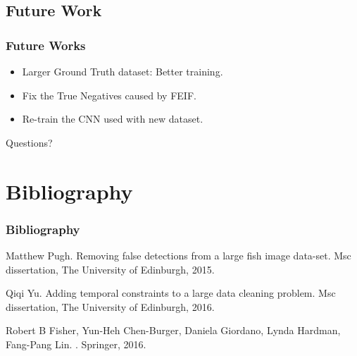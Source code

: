 \documentclass{beamer}[fullspacing]
\begin{document}
\subsection{Future Work}
\begin{frame}
\frametitle{Future Works}
\begin{itemize}
\item
Larger Ground Truth dataset: Better training.
\item
Fix the True Negatives caused by FEIF.
\item
Re-train the CNN used with new dataset.
\end{itemize}
\end{frame}


\begin{frame}
\begin{Huge}
\begin{center}
Questions?
\end{center}
\end{Huge}
\end{frame}




\section*{Bibliography}
\begin{frame}
\frametitle{Bibliography}
\begin{thebibliography}{3} %
Matthew Pugh.
\newblock Removing false detections from a large fish image data-set.
\newblock Msc dissertation, The University of Edinburgh, 2015.

Qiqi Yu.
\newblock Adding temporal constraints to a large data cleaning problem.
\newblock Msc dissertation, The University of Edinburgh, 2016.

Robert B Fisher{,} Yun-Heh Chen-Burger{,} Daniela Giordano{,} Lynda Hardman{,}
  Fang-Pang Lin.
.
\newblock Springer, 2016.

\end{thebibliography}
\end{frame}
\end{document}
